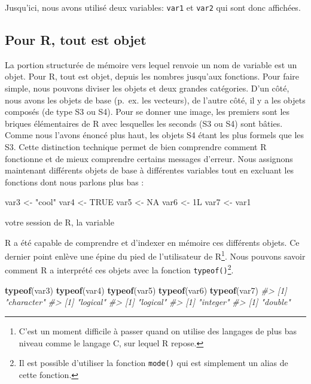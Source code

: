 \documentclass[]{article}
\newenvironment{Shaded}{\begin{snugshade}}{\end{snugshade}}
\newcommand{\CommentTok}[1]{\textcolor[rgb]{0.56,0.35,0.01}{\textit{#1}}}
\newcommand{\KeywordTok}[1]{\textcolor[rgb]{0.13,0.29,0.53}{\textbf{#1}}}
\newcommand{\NormalTok}[1]{#1}
\newcommand{\OtherTok}[1]{\textcolor[rgb]{0.56,0.35,0.01}{#1}}
\newcommand{\StringTok}[1]{\textcolor[rgb]{0.31,0.60,0.02}{#1}}
\begin{document}
Jusqu'ici, nous avons utilisé deux variables: \texttt{var1} et \texttt{var2} qui sont donc
affichées.

\hypertarget{pour-r-tout-est-objet}{%
\subsection*{Pour R, tout est objet}\label{pour-r-tout-est-objet}}

La portion structurée de mémoire vers lequel renvoie un nom de variable est un
objet. Pour R, tout est objet, depuis les nombres jusqu'aux fonctions. Pour faire simple, nous pouvons diviser les objets et deux grandes catégories. D'un côté, nous avons les objets de base (p.~ex. les vecteurs), de l'autre côté, il y a les objets composés (de type S3 ou S4). Pour se donner une image, les premiers sont les briques élémentaires de R avec lesquelles les seconds (S3 ou S4) sont bâties. Comme nous l'avons énoncé plus haut, les objets S4 étant les plus formels que les S3. Cette distinction technique permet de bien comprendre comment R fonctionne et de mieux comprendre certains messages d'erreur. Nous assignons maintenant différents objets de base à différentes variables tout en excluant les fonctions dont nous parlons plus bas :

\begin{Shaded}
\begin{Highlighting}[]
\NormalTok{var3 <-}\StringTok{ "cool"}
\NormalTok{var4 <-}\StringTok{ }\OtherTok{TRUE}
\NormalTok{var5 <-}\StringTok{ }\OtherTok{NA}
\NormalTok{var6 <-}\StringTok{ }\NormalTok{1L}
\NormalTok{var7 <-}\StringTok{ }\NormalTok{var1}
\end{Highlighting}
\end{Shaded}

votre session de R, la variable

R a été capable de comprendre et d'indexer en mémoire ces différents objets. Ce dernier point enlève une épine du pied de l'utilisateur de R\footnote{C'est un moment difficile à passer quand on utilise des langages de plus bas niveau comme le langage C, sur lequel R repose.}. Nous pouvons savoir comment R a interprété ces objets avec la fonction \texttt{typeof()}\footnote{Il est possible d'utiliser la fonction \texttt{mode()} qui est simplement un alias de cette fonction.}.

\begin{Shaded}
\begin{Highlighting}[]
\KeywordTok{typeof}\NormalTok{(var3)}
\KeywordTok{typeof}\NormalTok{(var4)}
\KeywordTok{typeof}\NormalTok{(var5)}
\KeywordTok{typeof}\NormalTok{(var6)}
\KeywordTok{typeof}\NormalTok{(var7)}
\CommentTok{#> [1] "character"}
\CommentTok{#> [1] "logical"}
\CommentTok{#> [1] "logical"}
\CommentTok{#> [1] "integer"}
\CommentTok{#> [1] "double"}
\end{Highlighting}
\end{Shaded}
\end{document}
